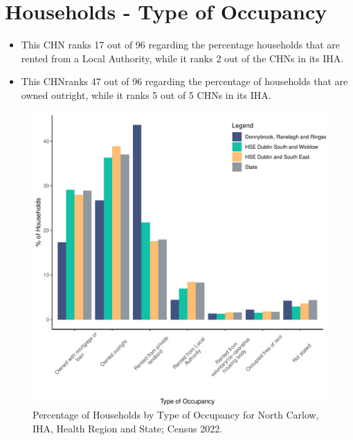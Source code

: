 \documentclass{article}
\begin{document}
\section{Households - Type of Occupancy}\label{sect:Households}
\begin{itemize}
\item This CHN ranks  17 out of 96 regarding the percentage households that are rented from a Local Authority, while it ranks  2 out of the CHNs in its IHA. 
\item This CHNranks  47 out of 96 regarding the percentage of households that are owned outright, while it ranks   5 out of 5 CHNs in its IHA.
\end{itemize}
\begin{figure}[H]
	\centering
	\includegraphics[width = 140mm]{../figures/HouseholdsED.pdf}
	\caption{Percentage of Households by Type of Occupancy for North Carlow, IHA, Health Region and State; Census 2022.}
	\label{fig:vbnv}
	\end{figure}
\end{document}
